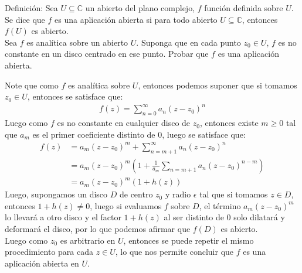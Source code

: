 \begin{homeworkProblem}
  Definición: Sea $U\subseteq \mathbb{C}$ un abierto del plano complejo, $f$ función definida sobre $U$. Se dice que $f$ es una aplicación abierta si para todo abierto $U\subseteq \mathbb{C}$, entonces $f(U)$ es abierto.\\
  Sea $f$ es analítica sobre un abierto $U$. Suponga que en cada punto $z_0\in U$, $f$ es no constante en un disco centrado en ese punto. Probar que $f$ es una aplicación abierta.
  \begin{solution}
    Note que como $f$ es analítica sobre $U$, entonces podemos suponer que si tomamos $z_0\in U$, entonces se satisface que:
    \begin{align*}
      f(z)=\sum_{n=0}^{\infty}a_n(z-z_0)^n
    \end{align*}
    Luego como $f$ es no constante en cualquier disco de $z_0$, entonces existe $m\geq 0$ tal que $a_m$ es el primer coeficiente distinto de 0, luego se satisface que:
    \begin{align*}
      f(z)&=a_m(z-z_0)^{m}+\sum_{n=m+1}^{\infty}a_n(z-z_0)^n\\
      &=a_m(z-z_0)^{m}\left( 1+\frac{1}{a_m}\sum_{n=m+1}a_n(z-z_0)^{n-m} \right)\\
      &=a_m(z-z_0)^{m}(1+h(z))
    \end{align*}
    Luego, supongamos un disco $D$ de centro $z_0$ y radio $\epsilon$ tal que si tomamos $z\in D$, entonces $1+h(z)\neq 0$, luego si evaluamos $f$ sobre $D$, el término $a_m(z-z_0)^m$ lo llevará a otro disco y el factor $1+h(z)$ al ser distinto de 0 solo dilatará y deformará el disco, por lo que podemos afirmar que $f(D)$ es abierto.\\
    Luego como $z_0$ es arbitrario en $U$, entonces se puede repetir el mismo procedimiento para cada $z\in U$, lo que nos permite concluir que $f$ es una aplicación abierta en $U$.
    \demostrado
  \end{solution}
\end{homeworkProblem}
